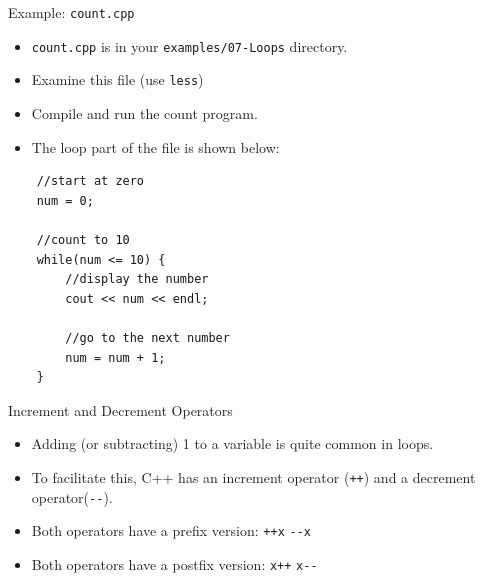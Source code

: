 \documentclass[xcolor=table]{beamer}
\begin{document}
\begin{frame}[fragile]{Example: \texttt{count.cpp}}
  \begin{itemize}[<+(1)->]
      \item \texttt{count.cpp} is in your \texttt{examples/07-Loops} directory.
      \item Examine this file (use \texttt{less})
      \item Compile and run the count program.
      \item The loop part of the file is shown below:
  \end{itemize}

  \begin{BVerbatim}
    //start at zero
    num = 0;

    //count to 10
    while(num <= 10) {
        //display the number
        cout << num << endl;

        //go to the next number
        num = num + 1;
    }
  \end{BVerbatim}
\end{frame}

\begin{frame}[fragile]{Increment and Decrement Operators}
  \begin{itemize}[<+->]
    \item Adding (or subtracting) 1 to a variable is quite common in loops.
    \item To facilitate this, C++ has an increment operator (\verb#++#) and a decrement operator(\verb#--#).
    \item Both operators have a prefix version:
      \newline\verb#++x#
      \newline\verb#--x#
    \item Both operators have a postfix version:
      \newline\verb#x++#
      \newline\verb#x--#
  \end{itemize}
\end{frame}
\end{document}
